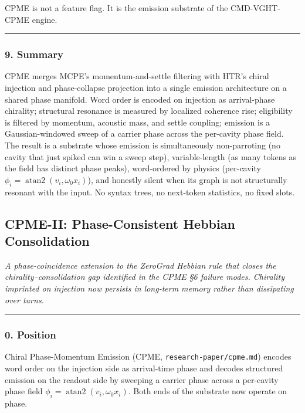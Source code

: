 \documentclass[
  11pt,
  a4paper,
]{article}
\begin{document}
CPME is not a feature flag. It is the emission substrate of the
CMD-VGHT-CPME engine.

\begin{center}\rule{0.5\linewidth}{0.5pt}\end{center}

\subsubsection{9. Summary}\label{summary}

CPME merges MCPE's momentum-and-settle filtering with HTR's chiral
injection and phase-collapse projection into a single emission
architecture on a shared phase manifold. Word order is encoded on
injection as arrival-phase chirality; structural resonance is measured
by localized coherence rise; eligibility is filtered by momentum,
acoustic mass, and settle coupling; emission is a Gaussian-windowed
sweep of a carrier phase across the per-cavity phase field. The result
is a substrate whose emission is simultaneously non-parroting (no cavity
that just spiked can win a sweep step), variable-length (as many tokens
as the field has distinct phase peaks), word-ordered by physics
(per-cavity \(\phi_i = \operatorname{atan2}(v_i, \omega_0 x_i)\)), and
honestly silent when its graph is not structurally resonant with the
input. No syntax trees, no next-token statistics, no fixed slots.

\newpage

\subsection{CPME-II: Phase-Consistent Hebbian
Consolidation}\label{cpme-ii-phase-consistent-hebbian-consolidation}

\emph{A phase-coincidence extension to the ZeroGrad Hebbian rule that
closes the chirality--consolidation gap identified in the CPME §6
failure modes. Chirality imprinted on injection now persists in
long-term memory rather than dissipating over turns.}

\begin{center}\rule{0.5\linewidth}{0.5pt}\end{center}

\subsubsection{0. Position}\label{position-1}

Chiral Phase-Momentum Emission (CPME, \texttt{research-paper/cpme.md})
encodes word order on the injection side as arrival-time phase and
decodes structured emission on the readout side by sweeping a carrier
phase across a per-cavity phase field
\(\phi_i = \operatorname{atan2}(v_i, \omega_0 x_i)\). Both ends of the
substrate now operate on phase.
\end{document}
